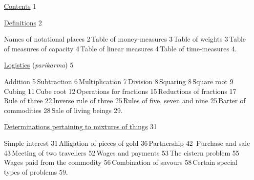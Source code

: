 \documentclass[10pt, openany]{book}
\begin{document}
\noindent \hyperref[con]{Contents} \hfill  1

\vspace{2mm}

\noindent \hyperref[def]{Definitions} \hfill 2

\vspace{2mm}

\begin{minipage}{0.8\textwidth} 
Names of notational places 2\textemdash \,Table of money-measures 3\textemdash \,Table of weights 3\textemdash \,Table of measures of capacity 4\textemdash \,Table of linear measures 4\textemdash \,Table of time-measures 4.
\end{minipage}

\vspace{2mm}

\noindent \hyperref[log]{Logistics} ({\englishfont\emph{parikarma}}) \hfill 5

\vspace{2mm}

\begin{minipage}{0.8\textwidth} 
 Addition 5\textemdash \,Subtraction 6\textemdash \,Multiplication 7\textemdash \,Division 8\textemdash \,Squaring 8\textemdash \,Square root 9\textemdash \,Cubing 11\textemdash \,Cube root 12\textemdash \,Operations for fractions 15\textemdash \,Reductions  of fractions 17\textemdash \,Rule of three 22\textemdash \,Inverse rule of three 25\textemdash \,Rules of five, seven and nine 25\textemdash \,Barter of commodities 28\textemdash \,Sale of living beings 29.
\end{minipage}

\vspace{2mm}

\noindent \hyperref[mix]{Determinations pertaining to mixtures of things}  \hfill 31 

\vspace{2mm}
\begin{minipage}{0.8\textwidth} 
 Simple interest 31\textemdash \,Alligation of pieces of gold 36\textemdash \,Partnership 42 \textemdash \,Purchase and sale 43\textemdash \,Meeting of two travellers 52\textemdash \,Wages and  payments 53\textemdash \,The cistern problem 55\textemdash \,Wages paid from the commodity 56\textemdash \,Combination of savours 58\textemdash \,Certain special types of problems 59.
 \end{minipage}


\vspace{2mm}
\end{document}

